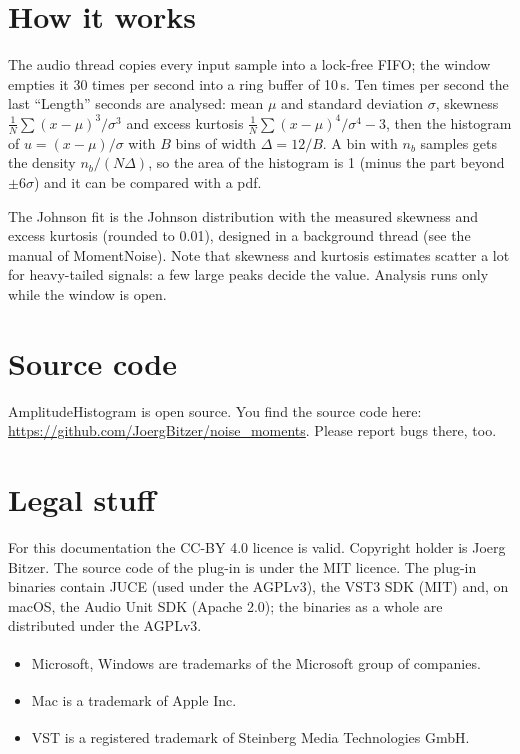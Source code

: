\documentclass[12pt]{article}
\newcommand{\pluginauthor}{Joerg Bitzer}
\newcommand{\sourceurl}{https://github.com/JoergBitzer/noise_moments}
\begin{document}
\begin{center}
\small

\end{center}

\section{How it works}
The audio thread copies every input sample into a lock-free FIFO; the window empties it 30 times
per second into a ring buffer of 10\,s. Ten times per second the last ``Length'' seconds are analysed:
mean $\mu$ and standard deviation $\sigma$, skewness $\frac{1}{N}\sum (x-\mu)^3/\sigma^3$ and excess
kurtosis $\frac{1}{N}\sum (x-\mu)^4/\sigma^4 - 3$, then the histogram of $u = (x-\mu)/\sigma$ with
$B$ bins of width $\Delta = 12/B$. A bin with $n_b$ samples gets the density $n_b/(N\Delta)$, so the
area of the histogram is 1 (minus the part beyond $\pm6\sigma$) and it can be compared with a pdf.

The Johnson fit is the Johnson distribution with the measured skewness and excess kurtosis (rounded
to 0.01), designed in a background thread (see the manual of MomentNoise). Note that skewness and
kurtosis estimates scatter a lot for heavy-tailed signals: a few large peaks decide the value.
Analysis runs only while the window is open.

\section{Source code}
AmplitudeHistogram is open source. You find the source code here:\newline
\url{\sourceurl}. Please report bugs there, too.

\section{Legal stuff}
For this documentation the CC-BY 4.0 licence is valid. Copyright holder is \pluginauthor.
The source code of the plug-in is under the MIT licence. The plug-in binaries contain JUCE
(used under the AGPLv3), the VST3 SDK (MIT) and, on macOS, the Audio Unit SDK (Apache 2.0);
the binaries as a whole are distributed under the AGPLv3.

\begin{itemize}
    \item Microsoft\textsuperscript{\textregistered}, Windows\textsuperscript{\textregistered}
    are trademarks of the Microsoft group of companies.
    \item Mac\textsuperscript{\textregistered} is a trademark of Apple Inc.
    \item VST\textsuperscript{\textregistered} is a registered trademark of Steinberg Media
    Technologies GmbH.
\end{itemize}
\end{document}
